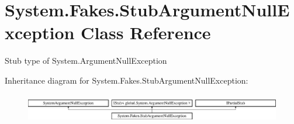 \hypertarget{class_system_1_1_fakes_1_1_stub_argument_null_exception}{\section{System.\-Fakes.\-Stub\-Argument\-Null\-Exception Class Reference}
\label{class_system_1_1_fakes_1_1_stub_argument_null_exception}
}


Stub type of System.\-Argument\-Null\-Exception 


Inheritance diagram for System.\-Fakes.\-Stub\-Argument\-Null\-Exception\-:\begin{figure}[H]
\begin{center}
\leavevmode
\includegraphics[height=1.309942cm]{class_system_1_1_fakes_1_1_stub_argument_null_exception}
\end{center}
\end{figure}

